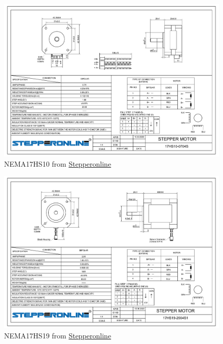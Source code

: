 \documentclass[a4paper,12pt]{article}
\begin{document}
 \begin{figure}[H]
    \begin{center}
        \includegraphics[width=14cm]{images/17HS10-0704S.pdf}
        \caption{NEMA17HS10 from \href{http://www.omc-stepperonline.com}{Stepperonline}}
        \label{fig:NEMA17HS10}
    \end{center}
\end{figure}
\begin{figure}[H]
    \begin{center}
        \includegraphics[width=14cm]{images/17HS19-2004S1.pdf}
        \caption{NEMA17HS19 from \href{http://www.omc-stepperonline.com}{Stepperonline}}
        \label{fig:NEMA17HS19}
    \end{center}
\end{figure}
\end{document}
